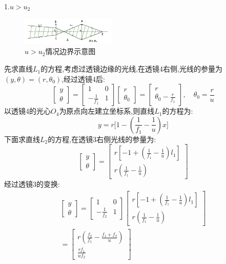 \documentclass[UTF8]{gapd}
\begin{document}
1.$u>u_2$
\begin{figure}
  \centering
  \includegraphics[width=0.4\textwidth]{images/6.jpg}
  \caption{$u>u_2$情况边界示意图}
  \label{fig:6}
\end{figure}
先求直线$L_1$的方程,考虑过透镜边缘的光线,在透镜4右侧,光线的参量为$(y,\theta)=(r,\theta_0)$,经过透镜4后:
\begin{equation}
  \begin{bmatrix}
      y\\
      \theta 
  \end{bmatrix}=\begin{bmatrix}
      1 & 0\\
      -\frac{1}{f_1}  & 1
  \end{bmatrix}
  \begin{bmatrix}
      r\\
      \theta_0 
  \end{bmatrix}=
  \begin{bmatrix}
      r\\
      \theta_0-\frac{r}{f_1} 
  \end{bmatrix}
  ,\quad \theta_0=\frac{r}{u} 
\end{equation}
以透镜4的光心$O_4$为原点向左建立坐标系,则直线$L_1$的方程为:
\begin{equation}
  y=r\big[1-(\frac{1}{f_1}-\frac{1}{u}  )x\big]
\end{equation}
下面求直线$L_2$的方程,在透镜3右侧光线的参量为:
\begin{equation}
  \begin{bmatrix}
      y\\
      \theta
  \end{bmatrix}=
  \begin{bmatrix}
      r[-1+(\frac{1}{f_1}-\frac{1}{u}  )l_1]\\
      r(\frac{1}{f_1}-\frac{1}{u}  )
  \end{bmatrix}
\end{equation}
经过透镜3的变换:
\begin{multline}
  \begin{bmatrix}
    y\\
    \theta
\end{bmatrix}=
\begin{bmatrix}
    1 & 0\\
    -\frac{1}{f_2}  & 1
\end{bmatrix}
\begin{bmatrix}
r [-1+(\frac{1}{f_1}-\frac{1}{u}  )l_1]\\
    r(\frac{1}{f_1}-\frac{1}{u}  )
\end{bmatrix}   \\
=
\begin{bmatrix}
    r(\frac{f_2}{f_1}-\frac{f_1+f_2}{u}  )\\
    \frac{rf_1}{uf_2} 
\end{bmatrix}
\end{multline}
\end{document}
